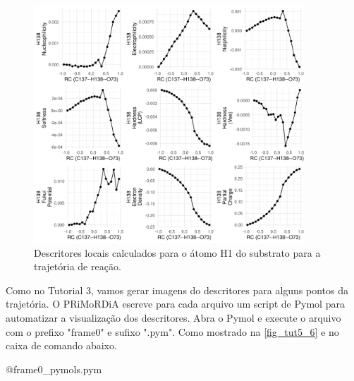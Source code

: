 \documentclass[a4paper,11pt]{refart}
\begin{document}
	 \hspace*{-\leftmarginwidth}
	 \begin{minipage}{\fullwidth}
	 	\begin{figure}[H]
	 		\begin{center}
	 			\includegraphics[width=4in]{la_2}
	 			\caption{Descritores locais calculados para o átomo H1 do substrato para a trajetória de reação.}
	 			\label{fig_tut5_6}
	 		\end{center}
	 	\end{figure}
	 \end{minipage}
	 
	 
	 Como no Tutorial 3, vamos gerar imagens do descritores para alguns pontos da trajetória. O PRiMoRDiA escreve para cada arquivo um script de Pymol para automatizar a visualização dos descritores. Abra o Pymol e execute o arquivo com o prefixo "frame0" e sufixo ".pym". Como mostrado na \autoref{fig_tut5_6} e no caixa de comando abaixo. 
	 
	 \hspace*{-\leftmarginwidth}
	 \begin{minipage}{\fullwidth}\begin{pymol}@frame0_pymols.pym\end{pymol}
	 \end{minipage}
	 
\end{document}
